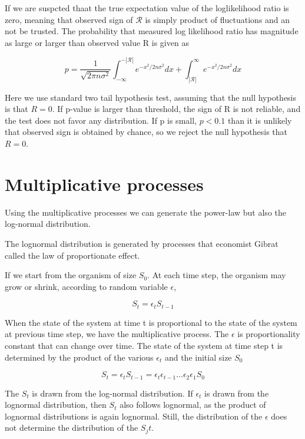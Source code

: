 If we are suspcted thaat the true expectation value of the loglikelihood ratio is zero, meaning that observed sign of $\mathcal{R}$ is simply product of fluctuations and an not be trusted. The probability that measured log likelihood ratio has magnitude as large or larger than observed value R is given as

\begin{equation}
p = \frac{1}{\sqrt{2\pi n \sigma^2}} \int_{-\infty}^{-|\mathcal{R}|}e^{-x^2/2n\sigma^2}dx + \int_{|\mathcal{R}|}^{\infty}e^{-x^2/2n\sigma^2}dx
\end{equation}

Here we use standard two tail hypothesis test, assuming that the null hypothesis is that $R= 0$. If p-value is larger than threshold, the sign of R is not reliable, and the test does not favor any distribution. If p is small, $p<0.1$ than it is unlikely that observed sign is obtained by chance, so we reject the null hypothesis that $R=0$. 

\section{Multiplicative processes}

Using the multiplicative processes we can generate the power-law but also the log-normal distribution. 

The lognormal distribution is generated by processes that economist Gibrat called the law of proportionate effect. 

If we start from the organism of size $S_0$. At each time step, the organism may grow or shrink,  according to random variable $\epsilon$, 

$$S_t = \epsilon_t S_{t-1}$$   

When the state of the system at time t is proportional to the state of the system at previous time step, we have the multiplicative process. The $\epsilon$ is proportionality constant that can change over time. The state of the system at time step t is determined by the product of the various $\epsilon_t$ and the initial size $S_0$ 

$$S_t = \epsilon_t S_{t-1} = \epsilon_t \epsilon_{t-1}... \epsilon_2 \epsilon_1 S_{0} $$

The $S_t$ is drawn from the log-normal distribution. If $\epsilon_t$ is drawn from the lognormal distribution, then $S_t$ also follows lognormal, as the product of lognormal distributions is again lognormal. Still, the distribution of the $\epsilon$ does not determine the distribution of the $S_jt$. 

